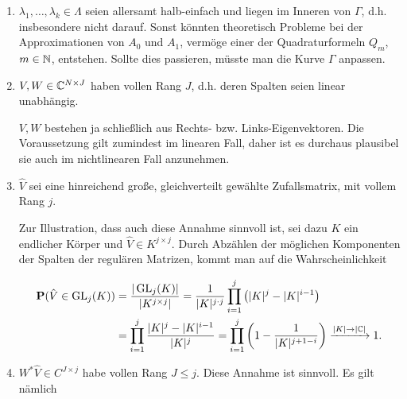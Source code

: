 \begin{enumerate}[label = \arabic*.]

    \item $\lambda_1, \dots, \lambda_k \in \Lambda$ seien allersamt halb-einfach und liegen im Inneren von $\Gamma$, d.h. insbesondere nicht darauf.
    Sonst könnten theoretisch Probleme bei der Approximationen von $A_0$ und $A_1$, vermöge einer der Quadraturformeln $Q_m$, $m \in \mathbb{N}$, entstehen.
    Sollte dies passieren, müsste man die Kurve $\Gamma$ anpassen.

    \item $V, W \in \mathbb{C}^{N \times J}$ haben vollen Rang $J$, d.h. deren Spalten seien linear unabhängig.

    $V, W$ bestehen ja schließlich aus Rechts- bzw. Links-Eigenvektoren.
    Die Voraussetzung gilt zumindest im linearen Fall, daher ist es durchaus plausibel sie auch im nichtlinearen Fall anzunehmen.

    \item $\hat V$ sei eine hinreichend große, gleichverteilt gewählte Zufallsmatrix, mit vollem Rang $j$.

    Zur Illustration, dass auch diese Annahme sinnvoll ist, sei dazu $K$ ein endlicher Körper und $\hat V \in K^{j \times j}$.
    Durch Abzählen der möglichen Komponenten der Spalten der regulären Matrizen, kommt man auf die Wahrscheinlichkeit

    \begin{align*}
        \mathbf P(\hat V \in \operatorname{GL}_j(K))
        & =
        \frac
        {
            |\operatorname{GL}_j(K)|
        }{
            |K^{j \times j}|
        }
        =
        \frac{1}
        {
            |K|^{j \cdot j}
        }
        \prod_{i=1}^j
            {\left ( 
                |K|^j - |K|^{i-1}
             \right )} \\
        & =
        \prod_{i=1}^j
            \frac
            {
                |K|^j - |K|^{i-1}
            }{
                |K|^j
            }
        =
        \prod_{i=1}^j
            {\left ( 
                1 - \frac{1}{|K|^{j + 1 - i}}
             \right )}
        \xrightarrow{|K| \to |\mathbb{C}|}
        1.
    \end{align*}

    \item $W^\ast \hat V \in C^{J \times j}$ habe vollen Rang $J \leq j$.
    Diese Annahme ist sinnvoll.
    Es gilt nämlich


\end{enumerate}
